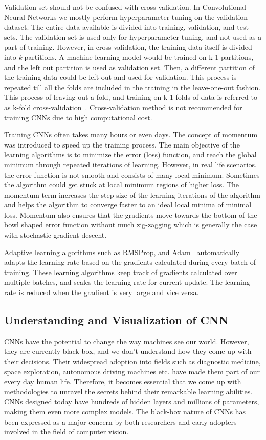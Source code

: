 Validation set should not be confused with cross-validation. In Convolutional Neural Networks we mostly perform hyperparameter tuning on the validation dataset. The entire data available is divided into training, validation, and test sets. The validation set is used only for hyperparameter tuning, and not used as a part of training. However, in cross-validation, the training data itself is divided into \textit{k} partitions. A machine learning model would be trained on k-1 partitions, and the left out partition is used as validation set. Then, a different partition of the training data could be left out and used for validation. This process is repeated till all the folds are included in the training in the leave-one-out fashion. This process of leaving out a fold, and training on k-1 folds of data is referred to as k-fold cross-validation~\cite{stone1974cross}. Cross-validation method is not recommended for training CNNs due to high computational cost.

Training CNNs often takes many hours or even days. The concept of momentum was introduced to speed up the training process. The main objective of the learning algorithms is to minimize the error (loss) function, and reach the global minimum through repeated iterations of learning. However, in real life scenarios, the error function is not smooth and consists of many local minimum. Sometimes  the algorithm could get stuck at local minimum regions of higher loss. The momentum term increases the step size of the learning iterations of the algorithm and helps the algorithm to converge faster to an ideal local minima of minimal loss.  Momentum also ensures that the gradients move towards the bottom of the bowl shaped error function without much zig-zagging which is generally the case with stochastic gradient descent.

Adaptive learning algorithms such as RMSProp, and Adam~\cite{ADAM} automatically adapts the learning rate based on the gradients calculated during every batch of training. These learning algorithms keep track of gradients calculated over multiple batches, and scales the learning rate for current update. The learning rate is reduced when the gradient is very large and vice versa.

\subsection{Understanding and Visualization of CNN}

CNNs have the potential to change the way machines see our world. However, they are currently black-box, and we don't understand how they come up with their decisions. Their widespread adoption into fields such as diagnostic medicine, space exploration, autonomous driving machines etc. have made them part of our every day human life. Therefore, it becomes essential that we come up with methodologies to unravel the secrets behind their remarkable learning abilities. CNNs designed today have hundreds of hidden layers and millions of parameters, making them even more complex models. The black-box nature of CNNs has been expressed as a major concern by both researchers and early adopters involved in the field of computer vision.


